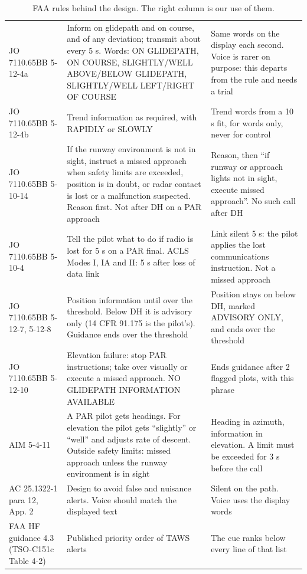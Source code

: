 \documentclass{ideathon2026}
\begin{document}
\begin{table}[tb]
\caption{FAA rules behind the design. The right column is our use of them.}
\label{tab:faa}
\begin{tabular}{L{86bp}L{226bp}L{186.9bp}}
\toprule
{} &  & \\
\midrule
JO 7110.65BB 5-12-4a & Inform on glidepath and on course, and of any deviation; transmit about every 5 s. Words: ON GLIDEPATH, ON COURSE, SLIGHTLY/WELL ABOVE/BELOW GLIDEPATH, SLIGHTLY/WELL LEFT/RIGHT OF COURSE & Same words on the display each second. Voice is rarer on purpose: this departs from the rule and needs a trial\\
JO 7110.65BB 5-12-4b & Trend information as required, with RAPIDLY or SLOWLY & Trend words from a 10 s fit, for words only, never for control\\
JO 7110.65BB 5-10-14 & If the runway environment is not in sight, instruct a missed approach when safety limits are exceeded, position is in doubt, or radar contact is lost or a malfunction suspected. Reason first. Not after DH on a PAR approach & Reason, then ``if runway or approach lights not in sight, execute missed approach''. No such call after DH\\
JO 7110.65BB 5-10-4 & Tell the pilot what to do if radio is lost for 5 s on a PAR final. ACLS Modes I, IA and II: 5 s after loss of data link & Link silent 5 s: the pilot applies the lost communications instruction. Not a missed approach\\
JO 7110.65BB 5-12-7, 5-12-8 & Position information until over the threshold. Below DH it is advisory only (14 CFR 91.175 is the pilot's). Guidance ends over the threshold & Position stays on below DH, marked ADVISORY ONLY, and ends over the threshold\\
JO 7110.65BB 5-12-10 & Elevation failure: stop PAR instructions; take over visually or execute a missed approach. NO GLIDEPATH INFORMATION AVAILABLE & Ends guidance after 2 flagged plots, with this phrase\\
AIM 5-4-11 & A PAR pilot gets headings. For elevation the pilot gets ``slightly'' or ``well'' and adjusts rate of descent. Outside safety limits: missed approach unless the runway environment is in sight & Heading in azimuth, information in elevation. A limit must be exceeded for 3 s before the call\\
AC 25.1322-1 para 12, App. 2 & Design to avoid false and nuisance alerts. Voice should match the displayed text & Silent on the path. Voice uses the display words\\
FAA HF guidance 4.3 (TSO-C151c Table 4-2) & Published priority order of TAWS alerts & The cue ranks below every line of that list\\
\bottomrule
\end{tabular}
\end{table}
\end{document}
